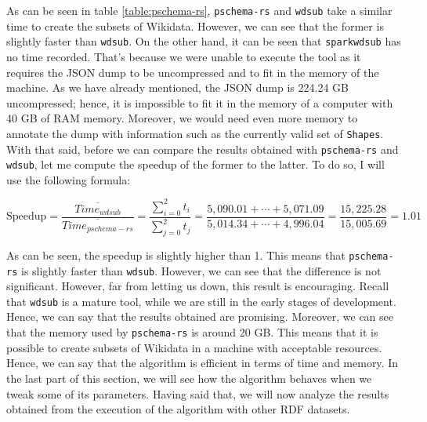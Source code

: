 As can be seen in table \ref{table:pschema-rs}, \texttt{pschema-rs} and \texttt{wdsub} take a similar time to create the subsets of Wikidata. However, we can see that the former is slightly faster than \texttt{wdsub}. On the other hand, it can be seen that \texttt{sparkwdsub} has no time recorded. That's because we were unable to execute the tool as it requires the JSON dump to be uncompressed and to fit in the memory of the machine. As we have already mentioned, the JSON dump is 224.24 GB uncompressed; hence, it is impossible to fit it in the memory of a computer with 40 GB of RAM memory. Moreover, we would need even more memory to annotate the dump with information such as the currently valid set of \texttt{Shapes}. With that said, before we can compare the results obtained with \texttt{pschema-rs} and \texttt{wdsub}, let me compute the speedup of the former to the latter. To do so, I will use the following formula:

\vspace*{-1em}

\begin{equation}
    \text{Speedup} = \frac{\overline{Time_{wdsub}}}{\overline{Time_{pschema-rs}}} = \frac{\sum_{i=0}^{2}t_i}{\sum_{j=0}^{2}t_j} = \frac{5,090.01 + \cdots + 5,071.09}{5,014.34 + \cdots + 4,996.04} = \frac{15,225.28}{15,005.69} = 1.01
\end{equation}

As can be seen, the speedup is slightly higher than 1. This means that \texttt{pschema-rs} is slightly faster than \texttt{wdsub}. However, we can see that the difference is not significant. However, far from letting us down, this result is encouraging. Recall that \texttt{wdsub} is a mature tool, while we are still in the early stages of development. Hence, we can say that the results obtained are promising. Moreover, we can see that the memory used by \texttt{pschema-rs} is around 20 GB. This means that it is possible to create subsets of Wikidata in a machine with acceptable resources. Hence, we can say that the algorithm is efficient in terms of time and memory. In the last part of this section, we will see how the algorithm behaves when we tweak some of its parameters. Having said that, we will now analyze the results obtained from the execution of the algorithm with other RDF datasets.

